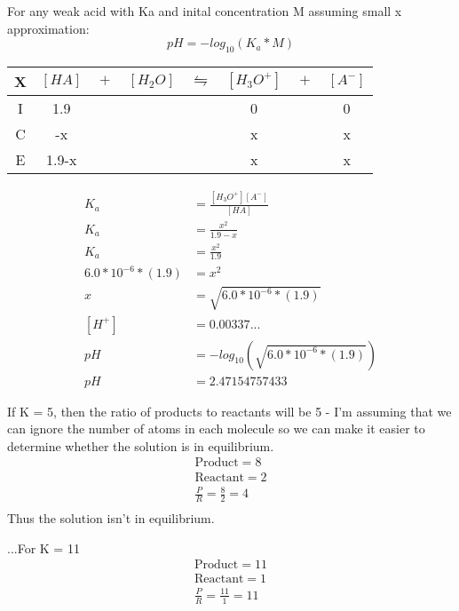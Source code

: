 \documentclass{article}  %
\begin{document}
For any weak acid with Ka and inital concentration M assuming small x approximation:
\begin{equation}
    pH = - log_{10}(K_a*M)
\end{equation}

\begin{tabular}{c|c@{}c@{}c@{}c@{}c@{}c@{}c}
    \hline
    X   & $[HA]$ & ${}+{}$ & $[H_2O]$ & ${}\leftrightharpoons{}$ & $[H_3O^+]$ & ${}+{}$ & $[A^-]$ \\
    \hline
    I   &  1.9    &&     &&  0   && 0  \\
    C   &   -x   &&     &&  x   &&  x \\
    E   &   1.9-x   &&     &&   x  && x  \\      
\end{tabular}

\begin{equation*}
    \begin{aligned}
        K_a &= \frac{[H_3O^+][A^-]}{[HA]} \\
        K_a &= \frac{x^2}{1.9-x} \\
        K_a &= \frac{x^2}{1.9} \\
        6.0*10^{-6}*(1.9) &= x^2 \\
        x &= \sqrt{6.0*10^{-6}*(1.9)} \\
        [H^+] &= 0.00337... \\
        pH &= -log_{10}\left(\sqrt{6.0*10^{-6}*(1.9)}\right) \\
        pH &= 2.47154757433
    \end{aligned}
\end{equation*}

If K = 5, then the ratio of products to reactants will be 5 - I'm assuming that we can ignore the number of atoms in each molecule so we can make it easier to determine whether the solution is in equilibrium.
\begin{equation*}
    \begin{aligned}
        \text{Product} = 8 \\
        \text{Reactant} = 2 \\
        \frac{P}{R} = \frac{8}{2} = 4 \\
    \end{aligned}
\end{equation*}
Thus the solution isn't in equilibrium.

...For K = 11
\begin{equation*}
    \begin{aligned}
        \text{Product} = 11 \\
        \text{Reactant} = 1 \\
        \frac{P}{R} = \frac{11}{1} = 11 \\
    \end{aligned}
\end{equation*}
\end{document}

